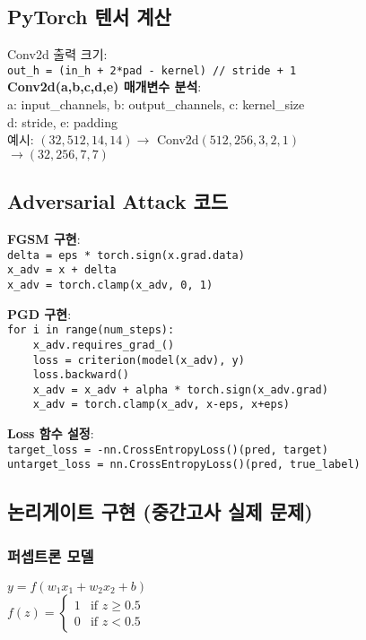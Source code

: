 \documentclass[6pt,landscape,a4paper]{article}
\begin{document}
\begin{multicols}{3}
\subsection{PyTorch 텐서 계산}
Conv2d 출력 크기:\\
\texttt{out\_h = (in\_h + 2*pad - kernel) // stride + 1}\\

\textbf{Conv2d(a,b,c,d,e) 매개변수 분석}:\\
a: input\_channels, b: output\_channels, c: kernel\_size\\
d: stride, e: padding\\
예시: $(32, 512, 14, 14) \rightarrow$ Conv2d$(512,256,3,2,1)$\\
$\rightarrow (32, 256, 7, 7)$

\subsection{Adversarial Attack 코드}
\textbf{FGSM 구현}:\\
\texttt{delta = eps * torch.sign(x.grad.data)}\\
\texttt{x\_adv = x + delta}\\
\texttt{x\_adv = torch.clamp(x\_adv, 0, 1)}

\textbf{PGD 구현}:\\
\texttt{for i in range(num\_steps):}\\
\texttt{\ \ \ \ x\_adv.requires\_grad\_()}\\
\texttt{\ \ \ \ loss = criterion(model(x\_adv), y)}\\
\texttt{\ \ \ \ loss.backward()}\\
\texttt{\ \ \ \ x\_adv = x\_adv + alpha * torch.sign(x\_adv.grad)}\\
\texttt{\ \ \ \ x\_adv = torch.clamp(x\_adv, x-eps, x+eps)}

\textbf{Loss 함수 설정}:\\
\texttt{target\_loss = -nn.CrossEntropyLoss()(pred, target)}\\
\texttt{untarget\_loss = nn.CrossEntropyLoss()(pred, true\_label)}
\subsection{논리게이트 구현 (중간고사 실제 문제)}
\subsubsection{퍼셉트론 모델}
$y = f(w_1x_1 + w_2x_2 + b)$\\
$f(z) = \begin{cases} 1 & \text{if } z \geq 0.5 \\ 0 & \text{if } z < 0.5 \end{cases}$

\end{multicols}
\end{document}
